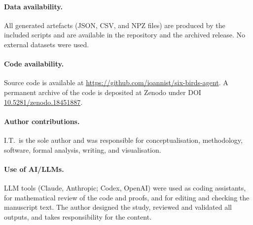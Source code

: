 \paragraph{Data availability.}
All generated artefacts (JSON, CSV, and NPZ files) are produced by the included scripts and are available in the repository and the archived release. No external datasets were used.

\paragraph{Code availability.}
Source code is available at \url{https://github.com/ioannist/six-birds-agent}. A permanent archive of the code is deposited at Zenodo under DOI \href{https://doi.org/10.5281/zenodo.18451887}{10.5281/zenodo.18451887}.

\paragraph{Author contributions.}
I.T.\ is the sole author and was responsible for conceptualisation, methodology, software, formal analysis, writing, and visualisation.

\paragraph{Use of AI/LLMs.}
LLM tools (Claude, Anthropic; Codex, OpenAI) were used as coding assistants, for mathematical review of the code and proofs, and for editing and checking the manuscript text. The author designed the study, reviewed and validated all outputs, and takes responsibility for the content.
